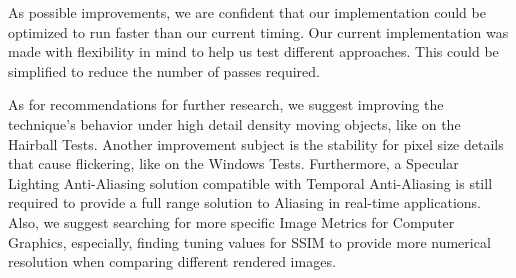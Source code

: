 \documentclass[pregrado]{tesis-usb} %
\begin{document}
As possible improvements, we are confident that our implementation could be optimized to run faster than our current timing. Our current implementation was made with flexibility in mind to help us test different approaches. This could be simplified to reduce the number of passes required. 

As for recommendations for further research, we suggest improving the technique's behavior under high detail density moving objects, like on the Hairball Tests. Another improvement subject is the stability for pixel size details that cause flickering, like on the Windows Tests. Furthermore, a Specular Lighting Anti-Aliasing solution compatible with Temporal Anti-Aliasing is still required to provide a full range solution to Aliasing in real-time applications. Also, we suggest searching for more specific Image Metrics for Computer Graphics, especially, finding tuning values for SSIM to provide more numerical resolution when comparing different rendered images.




\appendix
\end{document}
